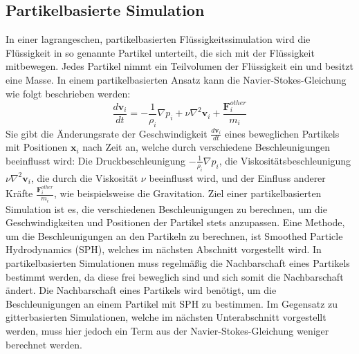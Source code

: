 \documentclass{scrreprt}
\begin{document}
\subsection{Partikelbasierte Simulation}
In einer lagrangeschen, partikelbasierten Flüssigkeitssimulation wird die Flüssigkeit in so genannte Partikel unterteilt,
die sich mit der Flüssigkeit mitbewegen. Jedes Partikel nimmt ein Teilvolumen der Flüssigkeit ein und besitzt eine Masse.
In einem partikelbasierten Ansatz kann die Navier-Stokes-Gleichung wie folgt beschrieben werden:
\begin{equation}
    \frac{d\textbf{v}_i}{dt} = -\frac{1}{\rho_i} \nabla p_i + \nu \nabla^2 \textbf{v}_i + \frac{\textbf{F}_i^{other}}{m_i}
\end{equation}
Sie gibt die Änderungsrate der Geschwindigkeit $\frac{d\textbf{v}_i}{dt}$ eines beweglichen Partikels mit Positionen $\textbf{x}_i$ nach Zeit an,
welche durch verschiedene Beschleunigungen beeinflusst wird:
Die Druckbeschleunigung $-\frac{1}{\rho_i} \nabla p_i$,
die Viskositätsbeschleunigung $\nu \nabla^2 \textbf{v}_i$, die durch die Viskosität $\nu$ beeinflusst wird,
und der Einfluss anderer Kräfte $\frac{\textbf{F}_i^{other}}{m_i}$,
wie beispielsweise die Gravitation.
Ziel einer partikelbasierten Simulation ist es, die verschiedenen Beschleunigungen zu berechnen,
um die Geschwindigkeiten und Positionen der Partikel stets anzupassen.
Eine Methode, um die Beschleunigungen an den Partikeln zu berechnen, ist Smoothed Particle Hydrodynamics (SPH),
welches im nächsten Abschnitt vorgestellt wird.
In partikelbasierten Simulationen muss regelmäßig die Nachbarschaft eines Partikels bestimmt werden,
da diese frei beweglich sind und sich somit die Nachbarschaft ändert.
Die Nachbarschaft eines Partikels wird benötigt, um die Beschleunigungen an einem Partikel mit SPH zu bestimmen.
Im Gegensatz zu gitterbasierten Simulationen, welche im nächsten Unterabschnitt vorgestellt werden,
muss hier jedoch ein Term aus der Navier-Stokes-Gleichung weniger berechnet werden.
\end{document}
